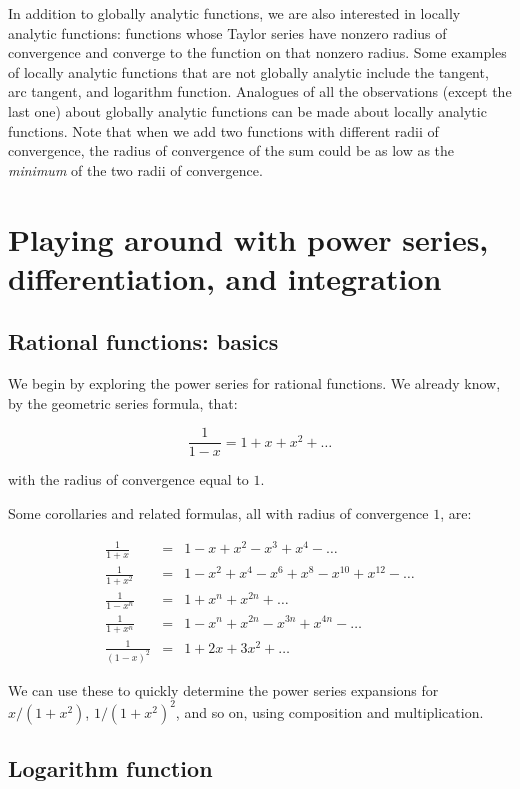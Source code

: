 \documentclass{amsart}
\begin{document}
In addition to globally analytic functions, we are also interested in
locally analytic functions: functions whose Taylor series have nonzero
radius of convergence and converge to the function on that nonzero
radius. Some examples of locally analytic functions that are not
globally analytic include the tangent, arc tangent, and logarithm
function. Analogues of all the observations (except the last one)
about globally analytic functions can be made about locally analytic
functions. Note that when we add two functions with different radii of
convergence, the radius of convergence of the sum could be as low as
the {\em minimum} of the two radii of convergence.

\section{Playing around with power series, differentiation, and integration}

\subsection{Rational functions: basics}

We begin by exploring the power series for rational functions. We
already know, by the geometric series formula, that:

$$\frac{1}{1 - x} = 1 + x + x^2 + \dots$$

with the radius of convergence equal to $1$.

Some corollaries and related formulas, all with radius of convergence
$1$, are:

\begin{eqnarray*}
  \frac{1}{1 + x} & = & 1 - x + x^2 - x^3 + x^4 - \dots\\
  \frac{1}{1 + x^2} & = & 1 - x^2 + x^4 - x^6 + x^8 - x^{10} + x^{12} - \dots\\
  \frac{1}{1 - x^n} & = & 1 + x^n + x^{2n} + \dots \\
  \frac{1}{1 + x^n} & = & 1 - x^n + x^{2n} - x^{3n} + x^{4n} - \dots\\
  \frac{1}{(1 - x)^2} & = & 1 + 2x + 3x^2 + \dots
\end{eqnarray*}

We can use these to quickly determine the power series expansions for
$x/(1 + x^2)$, $1/(1 + x^2)^2$, and so on, using composition and
multiplication.

\subsection{Logarithm function}
\end{document}
